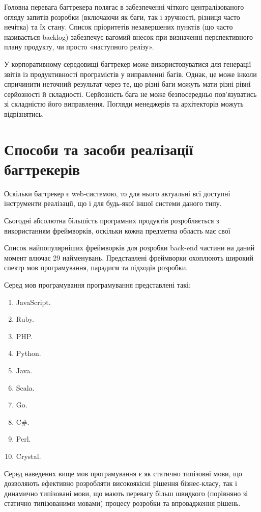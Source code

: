 \documentclass[../main.tex]{subfiles}
\begin{document}
Головна перевага багтрекера полягає в забезпеченні чіткого централізованого огляду запитів розробки (включаючи як баги, так і зручності, різниця часто нечітка) та їх стану. Список пріоритетів незавершених пунктів (що часто називається backlog) забезпечує вагомий внесок при визначенні перспективного плану продукту, чи просто «наступного релізу».

У корпоративному середовищі багтрекер може використовуватися для генерації звітів із продуктивності програмістів у виправленні багів. Однак, це може інколи спричинити неточний результат через те, що різні баги можуть мати різні рівні серйозності й складності. Серйозність бага не може безпосередньо пов'язуватись зі складністю його виправлення. Погляди менеджерів та архітекторів можуть відрізнятись.

\section{Способи та засоби реалізації багтрекерів}

Оскільки багтрекер є web-системою, то для нього актуальні всі доступні інструменти реалізації, що і для будь-якої іншої системи даного типу.

Сьогодні абсолютна більшість програмних продуктів розробляється з використанням фреймворків, оскільки кожна предметна область має свої 

Список найпопулярніших фреймворків для розробки back-end частини \cite{web_app_frameworks} на даний момент влючає 29 найменувань. Представлені фреймворки охоплюють широкий спектр мов програмування, парадигм та підходів розробки.

Серед мов програмування програмування представлені такі:
\begin{enumerate}
    \item JavaScript.
    \item Ruby.
    \item PHP.
    \item Python.
    \item Java.
    \item Scala.
    \item Go.
    \item C\#.
    \item Perl.
    \item Crystal.
\end{enumerate}

Серед наведених вище мов програмування є як статично типізовні мови, що дозволяють ефективно розробляти високоякісні рішення бізнес-класу, так і динамично типізовані мови, що мають перевагу більш швидкого (порівняно зі статично типізованими мовами) процесу розробки та впровадження рішень.
\end{document}
